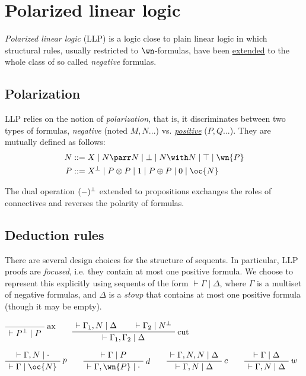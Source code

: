 \chapter{Polarized linear logic}\label{polarized-linear-logic}

\emph{Polarized linear logic} (LLP) is a logic close to plain linear
logic in which structural rules, usually restricted to \(\wn\)-formulas,
have been \hyperref[generalized-structural-rules-pos]{extended} to the
whole class of so called \emph{negative} formulas.

\section{Polarization}\label{polarization}

LLP relies on the notion of \emph{polarization}, that is, it
discriminates between two types of formulas, \emph{negative} (noted
\(M, N...\)) vs. \emph{\hyperref[positive-formula]{positive}} (\(P, Q...\)).
They are mutually defined as follows:
\begin{align*}
N &::= X \mid N \parr N \mid \bot \mid N \with N \mid \top \mid \wn{P} \\
P &::= X\orth \mid P \otimes P \mid 1 \mid P \oplus P \mid 0 \mid \oc{N}
\end{align*}

The dual operation \((-)^\bot\) extended to propositions exchanges the
roles of connectives and reverses the polarity of formulas.

\section{Deduction rules}\label{deduction-rules}

There are several design choices for the structure of sequents. In
particular, LLP proofs are \emph{focused}, i.e. they contain at most
one positive formula. We choose to represent this explicitly using
sequents of the form \(\vdash\Gamma\mid\Delta\), where \(\Gamma\) is a
multiset of negative formulas, and \(\Delta\) is a \emph{stoup} that
contains at most one positive formula (though it may be empty).

\(\LabelRule{\rulename{ax}}
\NulRule{\vdash P\orth \mid P}
\DisplayProof
\qquad
\AxRule{\vdash \Gamma_1, N \mid \Delta}
\AxRule{\vdash \Gamma_2 \mid N\orth}
\LabelRule{\rulename{cut}}
\BinRule{\vdash\Gamma_1, \Gamma_2 \mid \Delta}
\DisplayProof\)

\(\AxRule{\vdash\Gamma, N\mid\cdot}
\LabelRule{p}
\UnaRule{\vdash\Gamma\mid \oc{N}}
\DisplayProof
\qquad
\AxRule{\vdash\Gamma\mid P}
\LabelRule{d}
\UnaRule{\vdash\Gamma,\wn{P}\mid \cdot}
\DisplayProof
\qquad
\AxRule{\vdash\Gamma,N,N\mid \Delta}
\LabelRule{c}
\UnaRule{\vdash\Gamma, N\mid\Delta}
\DisplayProof
\qquad
\AxRule{\vdash\Gamma\mid \Delta}
\LabelRule{w}
\UnaRule{\vdash\Gamma,N\mid\Delta}
\DisplayProof\)

